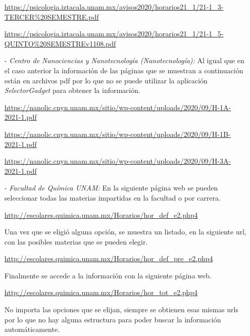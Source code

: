 \begin{itemize}
\url{https://psicologia.iztacala.unam.mx/avisos2020/horarios21_1/21-1_3-TERCER\%20SEMESTRE.pdf}

\url{https://psicologia.iztacala.unam.mx/avisos2020/horarios21_1/21-1_5-QUINTO\%20SEMESTREv1108.pdf}

\item[-] \textit{Centro de Nanociencias y Nanotecnología (Nanotecnología):} Al igual que en el caso anterior la información de las páginas que se muestran a continuación están en archivos pdf por lo que no se puede utilizar la aplicación \textit{SelectorGadget} para obtener la información.

\url{https://nanolic.cnyn.unam.mx/sitio/wp-content/uploads/2020/09/H-1A-2021-1.pdf}

\url{https://nanolic.cnyn.unam.mx/sitio/wp-content/uploads/2020/09/H-1B-2021-1.pdf}

\url{https://nanolic.cnyn.unam.mx/sitio/wp-content/uploads/2020/09/H-3A-2021-1.pdf}

\item[-] \textit{Facultad de Química UNAM:} En la siguiente página web se pueden seleccionar todas las materias impartidas en la facultad o por carrera.

\url{http://escolares.quimica.unam.mx/Horarios/hor_def_e2.php4}

Una vez que se eligió alguna opción, se muestra un listado, en la siguiente url, con las posibles materias que se pueden elegir.

\url{http://escolares.quimica.unam.mx/Horarios/hor_def_pre_e2.php4}

Finalmente se accede a la información con la siguiente página web.

\url{http://escolares.quimica.unam.mx/Horarios/hor_tot_e2.php4}

No importa las opciones que se elijan, siempre se obtienen esas mismas urls por lo que no hay alguna estructura para poder buscar la información automáticamente.


%
%
%
%



\end{itemize}
